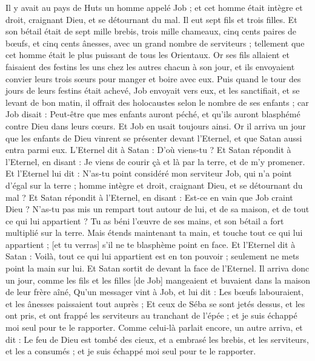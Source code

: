 \BFont
\begin{multicols}{2}
\VerseOne{}Il y avait au pays de Huts un homme appelé Job ; et cet homme était intègre et droit, craignant Dieu, et se détournant du mal.
Il eut sept fils et trois filles.
Et son bétail était de sept mille brebis, trois mille chameaux, cinq cents paires de bœufs, et cinq cents ânesses, avec un grand nombre de serviteurs ; tellement que cet homme était le plus puissant de tous les Orientaux.
Or ses fils allaient et faisaient des festins les uns chez les autres chacun à son jour, et ils envoyaient convier leurs trois sœurs pour manger et boire avec eux.
Puis quand le tour des jours de leurs festins était achevé, Job envoyait vers eux, et les sanctifiait, et se levant de bon matin, il offrait des holocaustes selon le nombre de ses enfants ; car Job disait : Peut-être que mes enfants auront péché, et qu'ils auront blasphémé contre Dieu dans leurs cœurs. Et Job en usait toujours ainsi.
Or il arriva un jour que les enfants de Dieu vinrent se présenter devant l'Eternel, et que Satan aussi entra parmi eux.
L'Eternel dit à Satan : D'où viens-tu ? Et Satan répondit à l'Eternel, en disant : Je viens de courir çà et là par la terre, et de m'y promener.
Et l'Eternel lui dit : N'as-tu point considéré mon serviteur Job, qui n'a point d'égal sur la terre ; homme intègre et droit, craignant Dieu, et se détournant du mal ?
Et Satan répondit à l'Eternel, en disant : Est-ce en vain que Job craint Dieu ?
N'as-tu pas mis un rempart tout autour de lui, et de sa maison, et de tout ce qui lui appartient ? Tu as béni l'œuvre de ses mains, et son bétail a fort multiplié sur la terre.
Mais étends maintenant ta main, et touche tout ce qui lui appartient ; [et tu verras] s'il ne te blasphème point en face.
Et l'Eternel dit à Satan : Voilà, tout ce qui lui appartient est en ton pouvoir ; seulement ne mets point la main sur lui. Et Satan sortit de devant la face de l'Eternel.
Il arriva donc un jour, comme les fils et les filles [de Job] mangeaient et buvaient dans la maison de leur frère aîné,
Qu'un messager vint à Job, et lui dit : Les bœufs labouraient, et les ânesses paissaient tout auprès ;
Et ceux de Séba se sont jetés dessus, et les ont pris, et ont frappé les serviteurs au tranchant de l'épée ; et je suis échappé moi seul pour te le rapporter.
Comme celui-là parlait encore, un autre arriva, et dit : Le feu de Dieu est tombé des cieux, et a embrasé les brebis, et les serviteurs, et les a consumés ; et je suis échappé moi seul pour te le rapporter.

\end{multicols}
